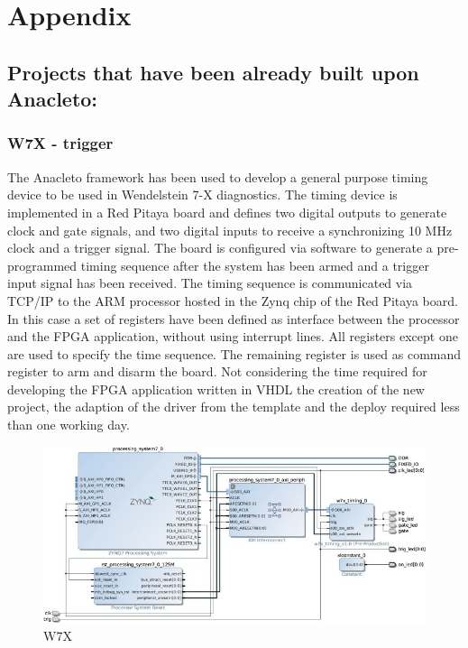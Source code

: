 \chapter{Appendix}
\section{Projects that have been already built upon Anacleto:}
\subsection{W7X - trigger }
\cite{RIGONI2018122}
The Anacleto framework has been used to develop a general purpose timing device to be used in Wendelstein 7-X diagnostics. The timing device is implemented in a Red Pitaya board and defines two digital outputs to generate clock and gate signals, and two digital inputs to receive a synchronizing 10 MHz clock and a trigger signal. The board is configured via software to generate a pre-programmed timing sequence after the system has been armed and a trigger input signal has been received. The timing sequence is communicated via TCP/IP to the ARM processor hosted in the Zynq chip of the Red Pitaya board. In this case a set of registers have been defined as interface between the processor and the FPGA application, without using interrupt lines. All registers except one are used to specify the time sequence. The remaining register is used as command register to arm and disarm the board. Not considering the time required for developing the FPGA application written in VHDL the creation of the new project, the adaption of the driver from the template and the deploy required less than one working day.

\begin{figure}
    \centering
    \includegraphics{img/APPENDIX/W7X_VHDL.jpg}
    \caption{W7X}
    \label{fig:W7X}
\end{figure}

